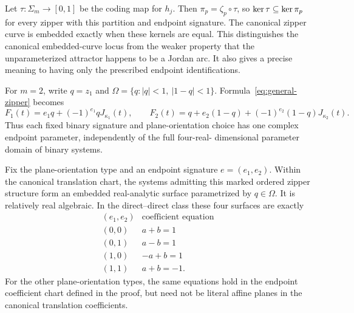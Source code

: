 Let $\tau:\Sigma_m\to[0,1]$ be the coding map for $h_j$. Then
$\pi_p=\zeta_p\circ\tau$, so $\operatorname{ker}\tau\subseteq\operatorname{ker}\pi_p$ for every
zipper with this partition and endpoint signature. The canonical
zipper curve is embedded exactly when these kernels are equal.
This distinguishes the canonical embedded-curve locus from the
weaker property that the unparameterized attractor happens to be
a Jordan arc. It also gives a precise meaning to having only the
prescribed endpoint identifications.

For $m=2$, write $q=z_1$ and
$\Omega=\{q:|q|<1,\ |1-q|<1\}$. Formula~\eqref{eq:general-zipper}
becomes
\begin{equation}\label{eq:binary-endpoint-zipper}
F_1(t)=e_1q+(-1)^{e_1}qJ_{\kappa_1}(t),\qquad
F_2(t)=q+e_2(1-q)+(-1)^{e_2}(1-q)J_{\kappa_2}(t).
\end{equation}
Thus each fixed binary signature and plane-orientation choice has
one complex endpoint parameter, independently of the full four-real-
dimensional parameter domain of binary systems.

\begin{theorem}\label{thm:zipper-surfaces}
Fix the plane-orientation type and an endpoint signature
$e=(e_1,e_2)$. Within the canonical translation chart, the systems
admitting this marked ordered zipper structure form an embedded
real-analytic surface parametrized by $q\in\Omega$. It is relatively
real algebraic. In the direct--direct class these four surfaces are
exactly
\begin{equation}\label{eq:four-planes}
\begin{array}{c|c}
(e_1,e_2)&\text{coefficient equation}\\\hline
(0,0)&a+b=1\\
(0,1)&a-b=1\\
(1,0)&-a+b=1\\
(1,1)&a+b=-1.
\end{array}
\end{equation}
For the other plane-orientation types, the same equations hold in
the endpoint coefficient chart defined in the proof, but need not
be literal affine planes in the canonical translation coefficients.
\end{theorem}

